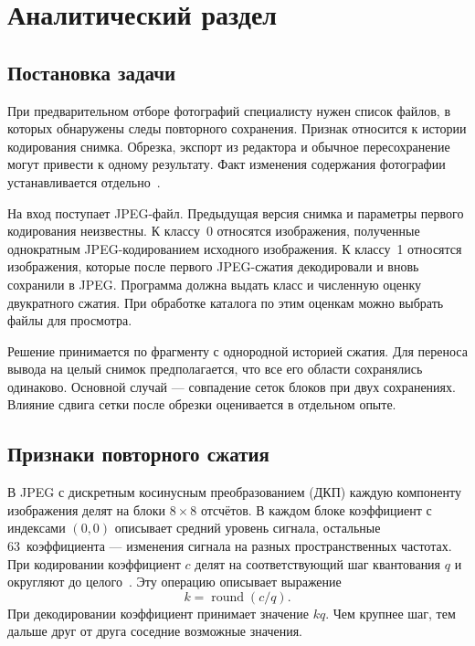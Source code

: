 \chapter{Аналитический раздел}

\section{Постановка задачи}

При предварительном отборе фотографий специалисту нужен список файлов, в которых обнаружены следы повторного сохранения. Признак относится к истории кодирования снимка. Обрезка, экспорт из редактора и обычное пересохранение могут привести к одному результату. Факт изменения содержания фотографии устанавливается отдельно~\cite{park2018}.

На вход поступает JPEG-файл. Предыдущая версия снимка и параметры первого кодирования неизвестны. К классу~0 относятся изображения, полученные однократным JPEG-кодированием исходного изображения. К классу~1 относятся изображения, которые после первого JPEG-сжатия декодировали и вновь сохранили в JPEG. Программа должна выдать класс и численную оценку двукратного сжатия. При обработке каталога по этим оценкам можно выбрать файлы для просмотра.

Решение принимается по фрагменту с однородной историей сжатия. Для переноса вывода на целый снимок предполагается, что все его области сохранялись одинаково. Основной случай --- совпадение сеток блоков при двух сохранениях. Влияние сдвига сетки после обрезки оценивается в отдельном опыте.

\section{Признаки повторного сжатия}

В JPEG с дискретным косинусным преобразованием (ДКП) каждую компоненту изображения делят на блоки $8\times8$ отсчётов. В каждом блоке коэффициент с индексами $(0,0)$ описывает средний уровень сигнала, остальные 63~коэффициента --- изменения сигнала на разных пространственных частотах. При кодировании коэффициент $c$ делят на соответствующий шаг квантования $q$ и округляют до целого~\cite{jpeg_standard}. Эту операцию описывает выражение
\begin{equation}
  k=\operatorname{round}(c/q).
  \label{eq:quant}
\end{equation}
При декодировании коэффициент принимает значение $kq$. Чем крупнее шаг, тем дальше друг от друга соседние возможные значения.

